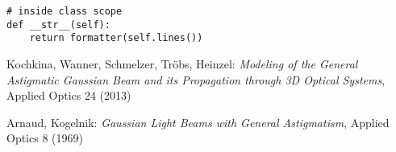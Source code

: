 \documentclass{article}
\begin{document}
\begin{lstlisting}
# inside class scope
def __str__(self):
	return formatter(self.lines())

\end{lstlisting}

\begin{thebibliography}{99}

Kochkina, Wanner, Schmelzer, Tr\"obs, Heinzel:
\textit{Modeling of the General Astigmatic Gaussian Beam and its Propagation through 3D Optical Systems},
Applied Optics 24 (2013)

Arnaud, Kogelnik:
\textit{Gaussian Light Beams with General Astigmatism},
Applied Optics 8 (1969)

\end{thebibliography}
\end{document}
